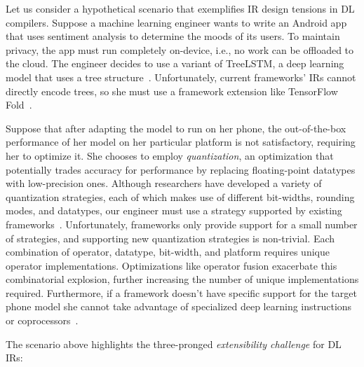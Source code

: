   Let us consider a hypothetical scenario that exemplifies
    IR design tensions in DL compilers.
  Suppose a machine learning engineer wants to write
    an Android app that uses sentiment analysis to
    determine the moods of its users.
  To maintain privacy, the app must run completely on-device,
    i.e., no work can be offloaded to the cloud.
  The engineer decides to use a variant of TreeLSTM,
    a deep learning model that uses a tree structure~\citep{tree_lstm}.
  Unfortunately, current frameworks' IRs cannot directly encode trees,
    so she must use a framework extension
    like TensorFlow Fold~\citep{tensorflowfold}.

  Suppose that after adapting the model to run on her phone,
    the out-of-the-box performance of her
    model on her particular platform is not satisfactory, requiring her to optimize it.
  She chooses to employ \textit{quantization}, an optimization that
    potentially trades accuracy for performance by replacing
    floating-point datatypes with low-precision ones.
  Although researchers have developed a variety of quantization
    strategies, each of which makes use of different bit-widths, rounding
    modes, and datatypes, our engineer must use a strategy supported
    by existing frameworks~\citep{gustafson2015end, tf_lite_ops_compat, glow_quant}.
  Unfortunately, frameworks only provide support for a small number
    of strategies, and supporting new quantization strategies is non-trivial.
  Each combination of operator, datatype, bit-width, and
    platform requires unique operator implementations.
  Optimizations like operator fusion exacerbate this combinatorial explosion,
    further increasing
    the number of unique implementations required.
  Furthermore, if a framework doesn't have specific support for
    the target phone model she cannot take advantage of specialized deep learning
    instructions or coprocessors~\citep{apple_neural_engine}.

  The scenario above highlights the three-pronged \textit{extensibility challenge}
    for DL IRs:

